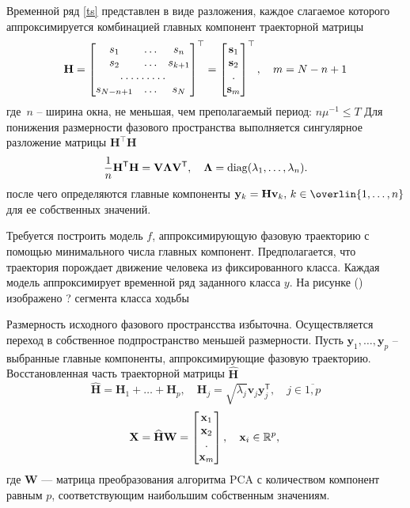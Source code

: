 \documentclass[12pt, twoside]{article}
\theoremstyle{definition}
\def\RR{\mathbb R}
\begin{document}
Временной ряд \eqref{ts} представлен в виде разложения, каждое слагаемое которого аппроксимируется комбинацией главных компонент траекторной матрицы
    \[ \mathbf{H} = \begin{bmatrix}
                        s_1 & \dots & s_n \\
                        s_2 & \dots & s_{k+1} \\
                        \hdotsfor{3} \\
                        s_{N-n+1} & \dots & s_N
                    \end{bmatrix}^\top = \begin{bmatrix}
                        \mathbf{s}_1 \\
                        \mathbf{s}_2  \\
                        \hdotsfor{1} \\
                        \mathbf{s}_m 
                    \end{bmatrix}^\top, \quad m = N - n + 1 \]
где~$n$ -- ширина окна, не меньшая, чем преполагаемый период: $n\mu^{-1} \leq T$ 
Для понижения размерности фазового пространства выполняется сингулярное разложение матрицы $\mathbf{H}^\top\mathbf{H}$
    \[ \frac{1}{n}\mathbf{H}^{\mathsf{T}}\mathbf{H} = \mathbf{V}\mathbf{\Lambda}\mathbf{V}^{\mathsf{T}}, \quad \mathbf{\Lambda} = \diag(\lambda_1,\dots,\lambda_{n}). \]
    после чего определяются главные компоненты $\mathbf{y}_k = \mathbf{Hv}_k,\, k\in \overlin{1, \dots, n}$ для ее собственных значений.

Требуется построить модель $f$, аппроксимирующую фазовую траекторию с помощью минимального числа главных компонент. Предполагается, что траектория порождает движение человека из фиксированного класса. Каждая модель аппроксимирует временной ряд заданного класса $y$. На рисунке () изображено ? сегмента класса ходьбы 
   

Размерность исходного фазового пространсства избыточна. Осуществляется переход в собственное подпространство меньшей размерности. Пусть $\mathbf{y}_1,\dots,\mathbf{y}_p$ -- выбранные главные компоненты, аппроксимирующие фазовую траекторию. Восстановленная часть траекторной матрицы $\mathbf{\widehat{H}}$
    \[ \mathbf{\widehat{H}} = \mathbf{H}_1  + \dots + \mathbf{H}_p, \quad \mathbf{H}_j = \sqrt{\lambda_j}\mathbf{v}_j\mathbf{y}_j^{\mathsf{T}},\quad j\in\overline{1, p}\]
    \[ \mathbf{X} = \mathbf{\widehat{H} W} = \begin{bmatrix}
                        \mathbf{x}_1 \\
                        \mathbf{x}_2  \\
                        \hdotsfor{1} \\
                        \mathbf{x}_m 
                    \end{bmatrix}, \quad \mathbf{x}_i\in \RR^p, \,  \]
где $\mathbf{W}$ --- матрица преобразования алгоритма PCA с количеством компонент равным $p$, соответствующим наибольшим собственным значениям.
\end{document}
